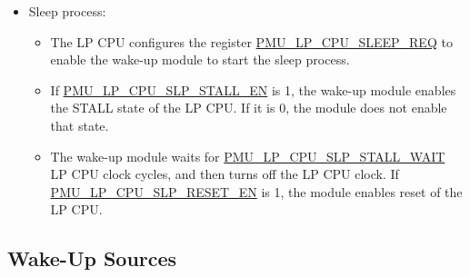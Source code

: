 \documentclass[main\_\_EN.tex]{subfiles}
\begin{document}
\begin{itemize}
    \item Sleep process:
    \begin{itemize}
    \item The LP CPU configures the register \hyperref[fielddesc:PMULPCPUSLEEPREQ]{PMU\_LP\_CPU\_SLEEP\_REQ} to enable the wake-up module to start the sleep process.
    \item If \hyperref[fielddesc:PMULPCPUSLPSTALLEN]{PMU\_LP\_CPU\_SLP\_STALL\_EN} is 1, the wake-up module enables the STALL state of the LP CPU. If it is 0, the module does not enable that state.
    \item The wake-up module waits for \hyperref[fielddesc:PMULPCPUSLPSTALLWAIT]{PMU\_LP\_CPU\_SLP\_STALL\_WAIT} LP CPU clock cycles, and then turns off the LP CPU clock. If \hyperref[fielddesc:PMULPCPUSLPRESETEN]{PMU\_LP\_CPU\_SLP\_RESET\_EN} is 1, the module enables reset of the LP CPU.
   \end{itemize}
   \end{itemize}



\subsection{Wake-Up Sources}
\end{document}
